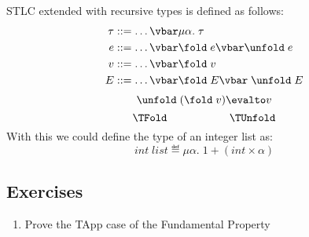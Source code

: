 STLC extended with recursive types is defined as follows:
\begin{align*}
  \tau &::= \dots \vbar \mu \alpha. \; \tau \\
  e    &::= \dots \vbar \fold \; e \vbar \unfold \; e \\
  v    &::= \dots \vbar \fold \; v\\
  E    &::= \dots \vbar \fold \; E \vbar \; \unfold \; E
\end{align*}
\[
\unfold \; (\fold \; v) \evalto v
\]
\[
\TFold \hspace{2cm} \TUnfold
\]
With this we could define the type of an integer list as:
\[
int\; list \eqdef \mu\alpha.\; 1 + (int \times \alpha)
\]
\begin{comment}
\[
  \Omega = (\tlabs{x}{\mu\alpha.\; \tarrow{\alpha}{\tau}}{(\unfold \; x) \; x}) 
\]
\end{comment}
\subsection*{Exercises}
\begin{enumerate}
\item Prove the TApp case of the Fundamental Property
\end{enumerate}
\clearpage
